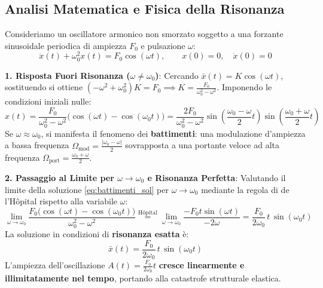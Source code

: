 \subsection{Analisi Matematica e Fisica della Risonanza}

Consideriamo un oscillatore armonico non smorzato soggetto a una forzante sinusoidale periodica di ampiezza $F_0$ e pulsazione $\omega$:
\begin{equation}
    \label{eq:risonanza_ode}
    \ddot{x}(t) + \omega_0^2 x(t) = F_0 \cos(\omega t), \qquad x(0) = 0, \quad \dot{x}(0) = 0
\end{equation}

\textbf{1. Risposta Fuori Risonanza ($\omega \neq \omega_0$)}:
Cercando $\bar{x}(t) = K \cos(\omega t)$, sostituendo si ottiene $(-\omega^2 + \omega_0^2)K = F_0 \implies K = \frac{F_0}{\omega_0^2 - \omega^2}$.
Imponendo le condizioni iniziali nulle:
\begin{equation}
    \label{eq:battimenti_sol}
    x(t) = \frac{F_0}{\omega_0^2 - \omega^2} \big( \cos(\omega t) - \cos(\omega_0 t) \big) = \frac{2F_0}{\omega_0^2 - \omega^2} \sin\left( \frac{\omega_0 - \omega}{2} t \right) \sin\left( \frac{\omega_0 + \omega}{2} t \right)
\end{equation}
Se $\omega \approx \omega_0$, si manifesta il fenomeno dei \textbf{battimenti}: una modulazione d'ampiezza a bassa frequenza $\Omega_{\text{mod}} = \frac{|\omega_0-\omega|}{2}$ sovrapposta a una portante veloce ad alta frequenza $\Omega_{\text{port}} = \frac{\omega_0+\omega}{2}$.

\textbf{2. Passaggio al Limite per $\omega \to \omega_0$ e Risonanza Perfetta}:
Valutando il limite della soluzione \eqref{eq:battimenti_sol} per $\omega \to \omega_0$ mediante la regola di de l'Hôpital rispetto alla variabile $\omega$:
\begin{equation}
    \lim_{\omega \to \omega_0} \frac{F_0 \big( \cos(\omega t) - \cos(\omega_0 t) \big)}{\omega_0^2 - \omega^2} \overset{\text{Hôpital}}{=} \lim_{\omega \to \omega_0} \frac{-F_0 t \sin(\omega t)}{-2\omega} = \frac{F_0}{2\omega_0} \, t\, \sin(\omega_0 t)
\end{equation}
La soluzione in condizioni di \textbf{risonanza esatta} è:
\begin{equation}
    \label{eq:sol_risonanza_lineare}
    \bar{x}(t) = \frac{F_0}{2\omega_0} \, t\, \sin(\omega_0 t)
\end{equation}
L'ampiezza dell'oscillazione $A(t) = \frac{F_0}{2\omega_0} t$ \textbf{cresce linearmente e illimitatamente nel tempo}, portando alla catastrofe strutturale elastica.

